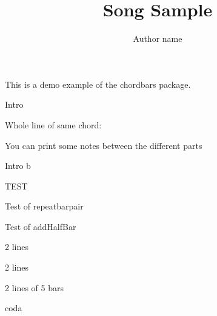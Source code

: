 \documentclass[11pt]{article}
\title{Song Sample}
\author{Author name}
\begin{document}
\bpbthree

\countbarsYes

\songtitle

This is a demo example of the chordbars package.


\begin{chordbar}{4}{Intro}
\end{chordbar}


Whole line of same chord:


You can print some notes between the different parts

\def\barsize{1.8}%

\begin{chordbar}[3]{6}{Intro b}
\repeatBar
{}
\end{chordbar}


\def\barsize{1.4}%
\begin{chordbar}[2]{4}{TEST}
\repeatBar
\end{chordbar}

\begin{chordbar}{5}{Test of repeatbarpair}
\repeatBarPair
{}
\end{chordbar}

\begin{chordbar}{4}{Test of addHalfBar}
\repeatBar
{}
\end{chordbar}


\begin{chordbar}[2]{6}{2 lines}
\repeatBar
{}
\repeatBar
\end{chordbar}

\begin{chordbar}[4]{11}{2 lines}
\newchordline
{}
\repeatBar
\end{chordbar}

\begin{chordbar}[2]{10}{2 lines of 5 bars}
\newchordline
{}
\repeatBar
\end{chordbar}


\begin{chordbar}[2]{11}{coda}
\end{chordbar}


\printNbBars
\end{document}
